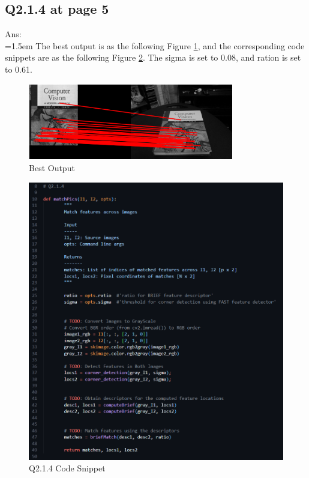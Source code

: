 \documentclass{article}
\begin{document}
	\subsection*{Q2.1.4 at page 5}
	Ans:\\
	\hangindent=1.5em \hspace{1.5em} The best output is as the following Figure \ref{fig:best_output}, and the corresponding code snippets are as the following Figure \ref{fig:csn1}. The sigma is set to 0.08, and ration is set to 0.61.
	\begin{figure}[H]		
		\centering
		\includegraphics[width=0.8\textwidth]{Q2_1_4_best_output.png}  %
		\caption{Best Output}
		\label{fig:best_output}
	\end{figure}
	\begin{figure}[H]		
	\centering
	\includegraphics[width=\textwidth]{Q2_1_4_best_output_code1.png}  %
	\caption{Q2.1.4 Code Snippet}
	\label{fig:csn1}
	\end{figure}
	
\end{document}
